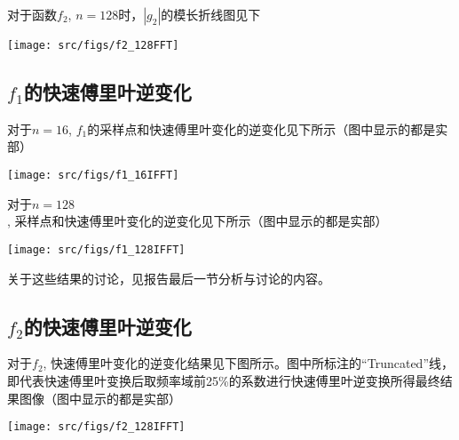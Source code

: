 \documentclass[english]{ctexart}
\begin{document}
对于函数$f_{2}$, $n=128$时，$|g_{2}|$的模长折线图见下

\texttt{[image: src/figs/f2\_128FFT]}

\subsection{$f_{1}$的快速傅里叶逆变化}

对于$n=16$, $f_{1}$的采样点和快速傅里叶变化的逆变化见下所示（图中显示的都是实部）

\texttt{[image: src/figs/f1\_16IFFT]}

对于$n=128$, 采样点和快速傅里叶变化的逆变化见下所示（图中显示的都是实部）

\texttt{[image: src/figs/f1\_128IFFT]}

关于这些结果的讨论，见报告最后一节分析与讨论的内容。

\subsection{$f_{2}$的快速傅里叶逆变化}

对于$f_{2}$, 快速傅里叶变化的逆变化结果见下图所示。图中所标注的“Truncated”线，即代表快速傅里叶变换后取频率域前25\%的系数进行快速傅里叶逆变换所得最终结果图像（图中显示的都是实部）

\texttt{[image: src/figs/f2\_128IFFT]}
\end{document}
